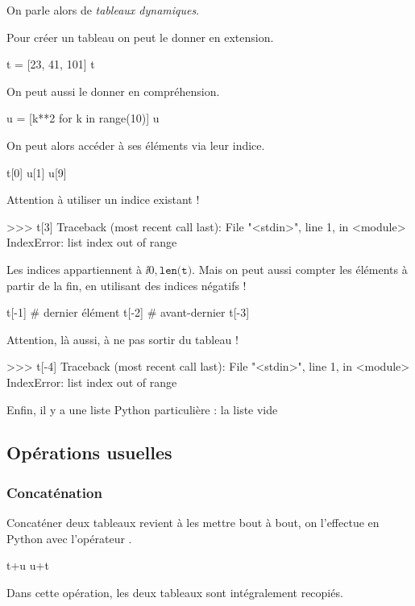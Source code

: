 On parle alors de \emph{tableaux dynamiques}.


Pour créer un tableau on peut le donner en extension.

\begin{pyconsole}
t = [23, 41, 101]
t
\end{pyconsole}

On peut aussi le donner en compréhension.

\begin{pyconsole}
u = [k**2 for k in range(10)]
u
\end{pyconsole}
On peut alors accéder à ses éléments via leur indice.
\begin{pyconsole}
t[0]
u[1]
u[9]
\end{pyconsole}

Attention à utiliser un indice existant !
\begin{pyverbatim}
>>> t[3]
Traceback (most recent call last):
  File "<stdin>", line 1, in <module>
IndexError: list index out of range
\end{pyverbatim}

Les indices appartiennent à $\ii{0,\texttt{len(t)}}$.
\clearslide{}
Mais on peut aussi compter les éléments à partir de la fin, en utilisant des indices négatifs !
\begin{pyconsole}
t[-1] # dernier élément
t[-2] # avant-dernier
t[-3]
\end{pyconsole}

Attention, là aussi, à ne pas sortir du tableau !

\begin{pyverbatim}
>>> t[-4]
Traceback (most recent call last):
  File "<stdin>", line 1, in <module>
IndexError: list index out of range
\end{pyverbatim}

Enfin, il y a une liste Python particulière : la liste vide \pyv{[]}

\subsection{Opérations usuelles}

\subsubsection{Concaténation}
Concaténer deux tableaux revient à les mettre bout à bout, on l'effectue en Python avec 
l'opérateur \pyv{+}.
\begin{pyconsole}
t+u
u+t
\end{pyconsole}
Dans cette opération, les deux tableaux sont intégralement recopiés. 

